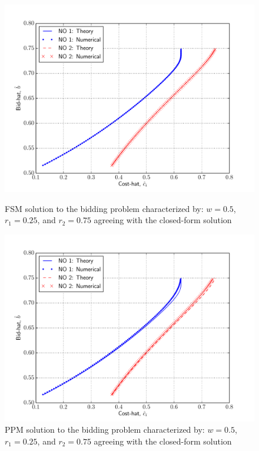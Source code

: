 \begin{figure}[p!]
  \includegraphics[width=\figsize]{Indirect/Figures/forward_shooting_verification}
  \caption{FSM solution to the bidding problem characterized by: $w=0.5$, $r_1 = 0.25$, and $r_2 = 0.75$ agreeing with the closed-form solution}
  \label{fig:forward_shooting_verification_indirect}
  \vspace{10mm}
  \includegraphics[width=\figsize]{Indirect/Figures/polynomial_projection_verification}
  \caption{PPM solution to the bidding problem characterized by: $w=0.5$, $r_1 = 0.25$, and $r_2 = 0.75$ agreeing with the closed-form solution}
  \label{fig:polynomial_projection_verification_indirect}
\end{figure}

